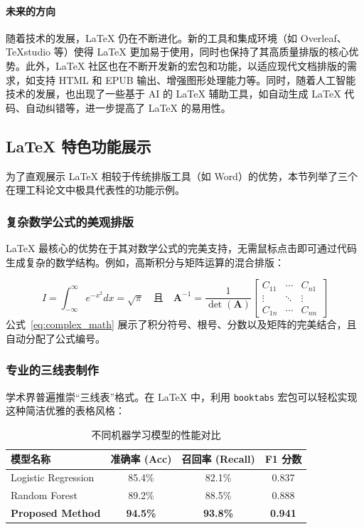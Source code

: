 \documentclass[UTF8,AutoFakeBold=1,AutoFakeSlant,zihao=-4]{SCAU}
\begin{document}
\paragraph{未来的方向}
随着技术的发展，LaTeX 仍在不断进化。新的工具和集成环境（如 Overleaf、TeXstudio 等）使得 LaTeX 更加易于使用，同时也保持了其高质量排版的核心优势。此外，LaTeX 社区也在不断开发新的宏包和功能，以适应现代文档排版的需求，如支持 HTML 和 EPUB 输出、增强图形处理能力等。同时，随着人工智能技术的发展，也出现了一些基于 AI 的 LaTeX 辅助工具，如自动生成 LaTeX 代码、自动纠错等，进一步提高了 LaTeX 的易用性。

\subsection{LaTeX 特色功能展示}
为了直观展示 LaTeX 相较于传统排版工具（如 Word）的优势，本节列举了三个在理工科论文中极具代表性的功能示例。

\subsubsection{复杂数学公式的美观排版}
LaTeX 最核心的优势在于其对数学公式的完美支持，无需鼠标点击即可通过代码生成复杂的数学结构。例如，高斯积分与矩阵运算的混合排版：

\begin{equation}
    I = \int_{-\infty}^{\infty} e^{-x^2} dx = \sqrt{\pi} \quad \text{且} \quad 
    \mathbf{A}^{-1} = \frac{1}{\det(\mathbf{A})} \begin{bmatrix}
    C_{11} & \cdots & C_{n1} \\
    \vdots & \ddots & \vdots \\
    C_{1n} & \cdots & C_{nn}
    \end{bmatrix}
    \label{eq:complex_math}
\end{equation}
公式~\eqref{eq:complex_math} 展示了积分符号、根号、分数以及矩阵的完美结合，且自动分配了公式编号。

\subsubsection{专业的三线表制作}
学术界普遍推崇“三线表”格式。在 LaTeX 中，利用 \texttt{booktabs} 宏包可以轻松实现这种简洁优雅的表格风格：

\begin{table}[htbp]
    \centering
    \caption{不同机器学习模型的性能对比}
    \label{tab:ml_performance}
    \begin{tabular}{lccc}
        \toprule
        \textbf{模型名称} & \textbf{准确率 (Acc)} & \textbf{召回率 (Recall)} & \textbf{F1 分数} \\
        \midrule
        Logistic Regression & 85.4\% & 82.1\% & 0.837 \\
        Random Forest       & 89.2\% & 88.5\% & 0.888 \\
        \textbf{Proposed Method} & \textbf{94.5\%} & \textbf{93.8\%} & \textbf{0.941} \\
        \bottomrule
    \end{tabular}
\end{table}
\end{document}
